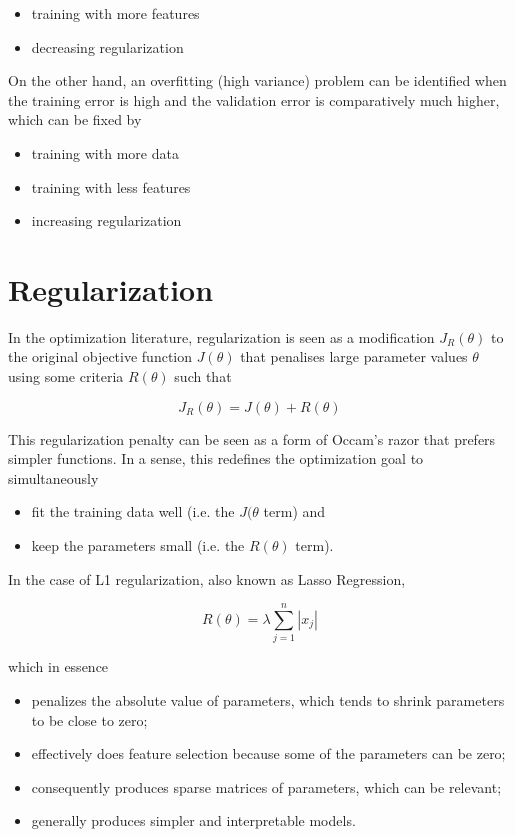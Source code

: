\begin{itemize}
    \item training with more features
    \item decreasing regularization
\end{itemize}

On the other hand, an overfitting (high variance) problem can be identified when the training error is high and the validation error is comparatively much higher, which can be fixed by

\begin{itemize}
    \item training with more data
    \item training with less features
    \item increasing regularization
\end{itemize}

\section{Regularization}

In the optimization literature, regularization is seen as a modification $J_R(\theta)$ to the original objective function $J(\theta)$ that penalises large parameter values $\theta$ using some criteria $R(\theta)$ such that

$$
J_R(\theta) = J(\theta) + R(\theta)
$$

This regularization penalty can be seen as a form of Occam's razor that prefers simpler functions. In a sense, this redefines the optimization goal to simultaneously

\begin{itemize}
    \item fit the training data well (i.e. the $J(\theta$ term) and
    \item keep the parameters small (i.e. the $R(\theta)$ term).
\end{itemize}

In the case of L1 regularization, also known as Lasso Regression,

$$
R(\theta) = \lambda \sum_{j=1}^{n} |x_j|
$$

which in essence

\begin{itemize}
    \item penalizes the absolute value of parameters, which tends to shrink parameters to be close to zero;
    \item effectively does feature selection because some of the parameters can be zero;
    \item consequently produces sparse matrices of parameters, which can be relevant;
    \item generally produces simpler and interpretable models.
\end{itemize}

